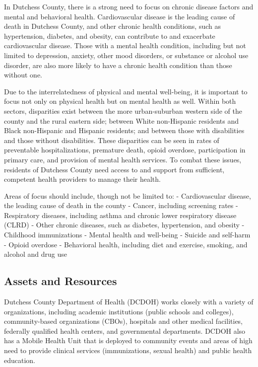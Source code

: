 \documentclass[
  english,
  letterpaper,
]{report}
\begin{document}
In Dutchess County, there is a strong need to focus on chronic disease
factors and mental and behavioral health. Cardiovascular disease is the
leading cause of death in Dutchess County, and other chronic health
conditions, such as hypertension, diabetes, and obesity, can contribute
to and exacerbate cardiovascular disease. Those with a mental health
condition, including but not limited to depression, anxiety, other mood
disorders, or substance or alcohol use disorder, are also more likely to
have a chronic health condition than those without one.

Due to the interrelatedness of physical and mental well-being, it is
important to focus not only on physical health but on mental health as
well. Within both sectors, disparities exist between the more
urban-suburban western side of the county and the rural eastern side;
between White non-Hispanic residents and Black non-Hispanic and Hispanic
residents; and between those with disabilities and those without
disabilities. These disparities can be seen in rates of preventable
hospitalizations, premature death, opioid overdose, participation in
primary care, and provision of mental health services. To combat these
issues, residents of Dutchess County need access to and support from
sufficient, competent health providers to manage their health.

Areas of focus should include, though not be limited to: -
Cardiovascular disease, the leading cause of death in the county -
Cancer, including screening rates - Respiratory diseases, including
asthma and chronic lower respiratory disease (CLRD) - Other chronic
diseases, such as diabetes, hypertension, and obesity - Childhood
immunizations - Mental health and well-being - Suicide and self-harm -
Opioid overdose - Behavioral health, including diet and exercise,
smoking, and alcohol and drug use

\subsection{Assets and Resources}\label{assets-and-resources}

Dutchess County Department of Health (DCDOH) works closely with a
variety of organizations, including academic institutions (public
schools and colleges), community-based organizations (CBOs), hospitals
and other medical facilities, federally qualified health centers, and
governmental departments. DCDOH also has a Mobile Health Unit that is
deployed to community events and areas of high need to provide clinical
services (immunizations, sexual health) and public health education.
\end{document}
